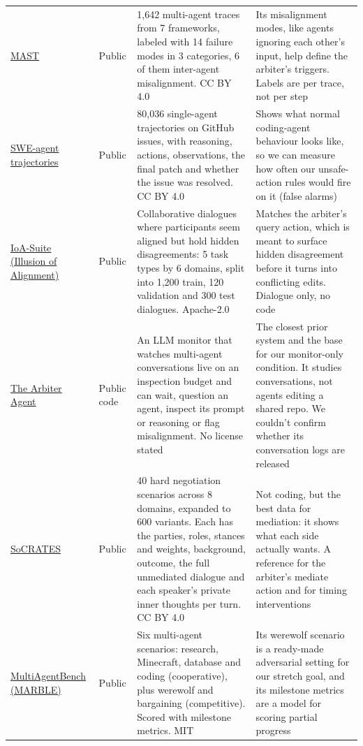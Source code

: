 \documentclass[11pt]{article}
\begin{document}
{\begin{longtable}{@{}L{2.55cm}L{1.30cm}L{5.23cm}L{\dimexpr\linewidth-9.08cm-6\tabcolsep\relax}@{}}
\href{https://huggingface.co/datasets/mcemri/MAST-Data}{MAST} & Public & 1,642 multi-agent traces from 7 frameworks, labeled with 14 failure modes in 3 categories, 6 of them inter-agent misalignment. CC BY 4.0 & Its misalignment modes, like agents ignoring each other's input, help define the arbiter's triggers. Labels are per trace, not per step \\
\href{https://huggingface.co/datasets/nebius/SWE-agent-trajectories}{SWE-agent trajectories} & Public & 80,036 single-agent trajectories on GitHub issues, with reasoning, actions, observations, the final patch and whether the issue was resolved. CC BY 4.0 & Shows what normal coding-agent behaviour looks like, so we can measure how often our unsafe-action rules would fire on it (false alarms) \\
\href{https://github.com/THUNLP-MT/IoA}{IoA-Suite (Illusion of Alignment)} & Public & Collaborative dialogues where participants seem aligned but hold hidden disagreements: 5 task types by 6 domains, split into 1,200 train, 120 validation and 300 test dialogues. Apache-2.0 & Matches the arbiter's query action, which is meant to surface hidden disagreement before it turns into conflicting edits. Dialogue only, no code \\
\href{https://github.com/aisilab/arbiter}{The Arbiter Agent} & Public code & An LLM monitor that watches multi-agent conversations live on an inspection budget and can wait, question an agent, inspect its prompt or reasoning or flag misalignment. No license stated & The closest prior system and the base for our monitor-only condition. It studies conversations, not agents editing a shared repo. We couldn't confirm whether its conversation logs are released \\
\href{https://huggingface.co/datasets/DISLab/SoCRATES}{SoCRATES} & Public & 40 hard negotiation scenarios across 8 domains, expanded to 600 variants. Each has the parties, roles, stances and weights, background, outcome, the full unmediated dialogue and each speaker's private inner thoughts per turn. CC BY 4.0 & Not coding, but the best data for mediation: it shows what each side actually wants. A reference for the arbiter's mediate action and for timing interventions \\
\href{https://github.com/ulab-uiuc/MARBLE}{MultiAgentBench (MARBLE)} & Public & Six multi-agent scenarios: research, Minecraft, database and coding (cooperative), plus werewolf and bargaining (competitive). Scored with milestone metrics. MIT & Its werewolf scenario is a ready-made adversarial setting for our stretch goal, and its milestone metrics are a model for scoring partial progress \\

\end{longtable}}
\end{document}
